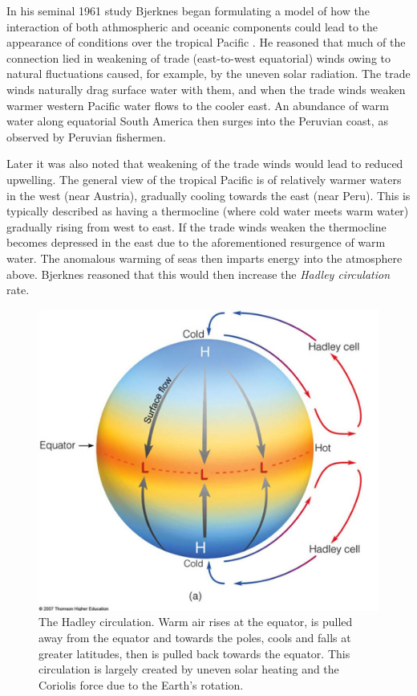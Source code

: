 In his seminal 1961 study Bjerknes began formulating a model of how the
interaction of both athmospheric and oceanic components could lead to the
appearance of \elnino{} conditions over the tropical Pacific
\citep{bjerknes1961}. He reasoned that much of the connection lied in weakening
of trade (east-to-west equatorial) winds owing to natural fluctuations caused,
for example, by the uneven solar radiation. The trade winds naturally drag
surface water with them, and when the trade winds weaken warmer western Pacific
water flows to the cooler east. An abundance of warm water along equatorial
South America then surges into the Peruvian coast, as observed by Peruvian
fishermen.

Later \citep{bjerknes1966} it was also noted that weakening of the trade winds
would lead to reduced upwelling. The general view of the tropical Pacific is of
relatively warmer waters in the west (near Austria), gradually cooling towards
the east (near Peru). This is typically described as having a thermocline (where
cold water meets warm water) gradually rising from west to east. If the trade
winds weaken the thermocline becomes depressed in the east due to the
aforementioned resurgence of warm water. The anomalous warming of seas then
imparts energy into the atmosphere above. Bjerknes reasoned that this would then
increase the \emph{Hadley circulation} rate.

\begin{figure}[h]
  \centering
  \includegraphics[width=0.9\linewidth]{figures/hadleycell.png}
  \caption{The Hadley circulation. Warm air rises at the equator, is pulled away
    from the equator and towards the poles, cools and falls at greater
    latitudes, then is pulled back towards the equator. This circulation is
    largely created by uneven solar heating and the Coriolis force due to the
    Earth's rotation.}
  \label{fig:hadleycell}
\end{figure}

